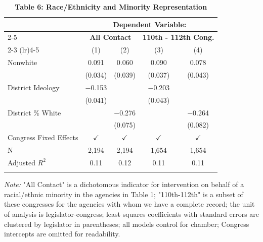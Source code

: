 \documentclass[12pt,letterpaper]{article}
\begin{document}
	\begin{table}[!htbp] 
		\centering 
		\begin{threeparttable}
			\caption{\textbf{Table 6: Race/Ethnicity and Minority Representation}} 
			\label{tab6} 
			\begin{tabular}{l@{\hspace{2cm}}cccc} 
				\\[-1.8ex]\hline 
				& \multicolumn{4}{c}{\textbf{Dependent Variable:}} \\ 
				\cline{2-5} 
				& \multicolumn{2}{c}{\textbf{All Contact}} &  \multicolumn{2}{c}{\textbf{110th - 112th Cong.}}\\ 
				\cmidrule(lr){2-3} 
				\cmidrule(lr){4-5}
			    & (1) & (2) & (3) & (4)\\ 
			    \hline
				Nonwhite & 0.091 & 0.060 & 0.090 & 0.078 \\ 
				& (0.034) & (0.039) & (0.037) & (0.043) \\ 
				District Ideology & $-$0.153 &  & $-$0.203 &  \\ 
				& (0.041) &  & (0.043) &  \\ 
				District \% White &  & $-$0.276 &  & $-$0.264 \\ 
				&  & (0.075) &  & (0.082) \\ 
				Congress Fixed Effects & $\checkmark$ & $\checkmark$ & $\checkmark$  & $\checkmark$ \\ 
				N & 2,194 & 2,194 & 1,654 & 1,654 \\ 
				Adjusted $R^2$ & 0.11 & 0.12 & 0.11 & 0.11 \\ 
				\hline 
				\hline \\[-1.8ex] 
			\end{tabular} 
			\begin{tablenotes}[flushleft]\small
				\item \textit{Note:} "All Contact" is a dichotomous indicator for intervention on behalf of a racial/ethnic minority in the agencies in Table 1; "110th-112th" is a subset of these congresses for the agencies with whom we have a complete record; the unit of analysis is legislator-congress; least squares coefficients with standard errors are clustered by legislator in parentheses; all models control for chamber; Congress intercepts are omitted for readability.
			\end{tablenotes}
		\end{threeparttable}
	\end{table} 
	
	\newpage
	
\end{document}
